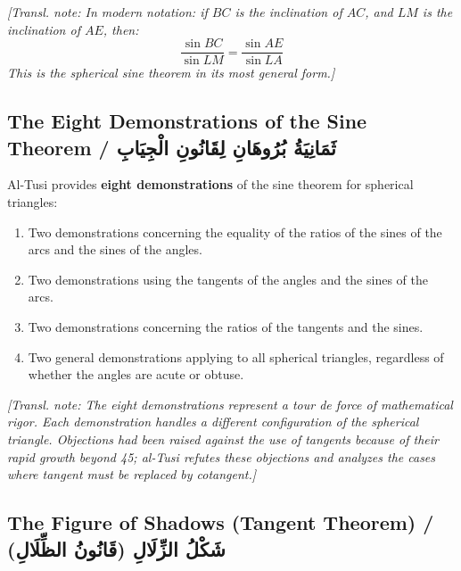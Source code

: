 \documentclass[11pt,a4paper]{article}
\theoremstyle{plain}
\theoremstyle{definition}
\theoremstyle{remark}
\newcommand{\ar}[1]{{\arabicfont\beginR #1\endR}}
\newcommand{\transnote}[1]{%
  \par\vspace{0.3em}%
  \noindent\textcolor{notecolor}{\textit{[Transl. note: #1]}}%
  \vspace{0.3em}%
}
\begin{document}
\transnote{In modern notation: if $BC$ is the inclination of $AC$, and $LM$ is
the inclination of $AE$, then:
\[\frac{\sin BC}{\sin LM} = \frac{\sin AE}{\sin LA}\]
This is the spherical sine theorem in its most general form.}

\subsection{The Eight Demonstrations of the Sine Theorem / \ar{ثَمَانِيَةُ بُرُوهَانِ لِقَانُونِ الْجِيَابِ}}
\label{sec:sine-theorem}

\noindent Al-Tusi provides \textbf{eight demonstrations} of the sine theorem
for spherical triangles:

\begin{enumerate}[leftmargin=2em]
\item[\textbf{1--2.}] Two demonstrations concerning the equality of the ratios
of the sines of the arcs and the sines of the angles.
\item[\textbf{3--4.}] Two demonstrations using the tangents of the angles and
the sines of the arcs.
\item[\textbf{5--6.}] Two demonstrations concerning the ratios of the tangents
and the sines.
\item[\textbf{7--8.}] Two general demonstrations applying to all spherical
triangles, regardless of whether the angles are acute or obtuse.
\end{enumerate}

\transnote{The eight demonstrations represent a tour de force of mathematical
rigor. Each demonstration handles a different configuration of the spherical
triangle. Objections had been raised against the use of tangents because of
their rapid growth beyond 45\degree; al-Tusi refutes these objections and
analyzes the cases where tangent must be replaced by cotangent.}

\subsection{The Figure of Shadows (Tangent Theorem) / \ar{شَكْلُ الزِّلَالِ (قَانُونُ الظِّلَالِ)}}
\label{sec:shadows}
\end{document}
